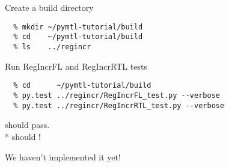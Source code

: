 
\section[{\it Hands-On} RegIncr]{}

\begin{task}\begin{frame}[fragile]{Create a build directory}
\medskip
\begin{verbatim}
  % mkdir ~/pymtl-tutorial/build
  % cd    ~/pymtl-tutorial/build
  % ls    ../regincr
\end{verbatim}

\end{frame}
\end{task}

\begin{task}\begin{frame}[fragile]{Run RegIncrFL and RegIncrRTL tests}
\medskip
\begin{verbatim}
  % cd      ~/pymtl-tutorial/build
  % py.test ../regincr/RegIncrFL_test.py --verbose
  % py.test ../regincr/RegIncrRTL_test.py --verbose
\end{verbatim}

\begin{centering}
 should pass. \\*
 should !

\vspace{0.4in}
We haven't implemented it yet!

\end{centering}

\end{frame}
\end{task}

